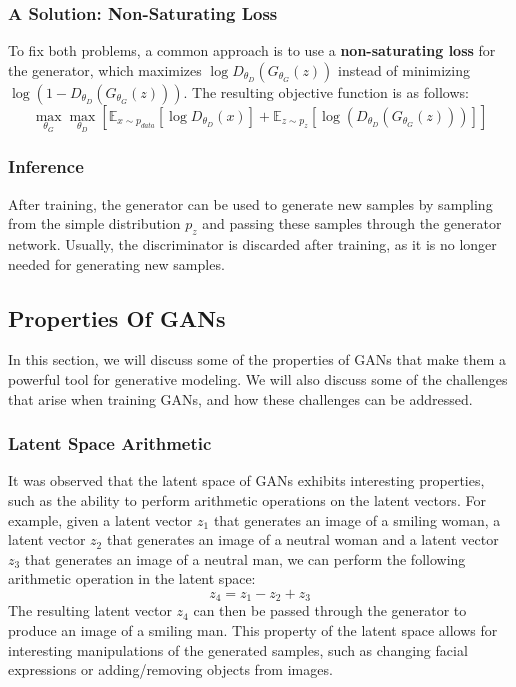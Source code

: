 \subsubsection{A Solution: Non-Saturating Loss}
To fix both problems, a common approach is to use a \textbf{non-saturating loss} for the generator, which maximizes $\log D_{\theta_D}(G_{\theta_G}(z))$ instead of minimizing $\log(1 - D_{\theta_D}(G_{\theta_G}(z)))$.
The resulting objective function is as follows:
\begin{equation}
    \max_{\theta_G} \max_{\theta_D} \left[ \mathbb{E}_{x \sim p_{data}}[\log D_{\theta_D}(x)] + \mathbb{E}_{z \sim p_{z}}[ \log(D_{\theta_D}(G_{\theta_G}(z)))] \right]
\end{equation}

\subsubsection{Inference}
After training, the generator can be used to generate new samples by sampling from the simple distribution $p_{z}$ and passing these samples through the generator network.
Usually, the discriminator is discarded after training, as it is no longer needed for generating new samples.


\subsection{Properties Of GANs}
In this section, we will discuss some of the properties of GANs that make them a powerful tool for generative modeling. 
We will also discuss some of the challenges that arise when training GANs, and how these challenges can be addressed.

\subsubsection{Latent Space Arithmetic}
It was observed that the latent space of GANs exhibits interesting properties, such as the ability to perform arithmetic operations on the latent vectors.
For example, given a latent vector $z_1$ that generates an image of a smiling woman, a latent vector $z_2$ that generates an image of a neutral woman and a latent vector $z_3$ that generates an image of a neutral man, we can perform the following arithmetic operation in the latent space:
\begin{equation}
    z_4 = z_1 - z_2 + z_3
\end{equation}
The resulting latent vector $z_4$ can then be passed through the generator to produce an image of a smiling man. 
This property of the latent space allows for interesting manipulations of the generated samples, such as changing facial expressions or adding/removing objects from images.

